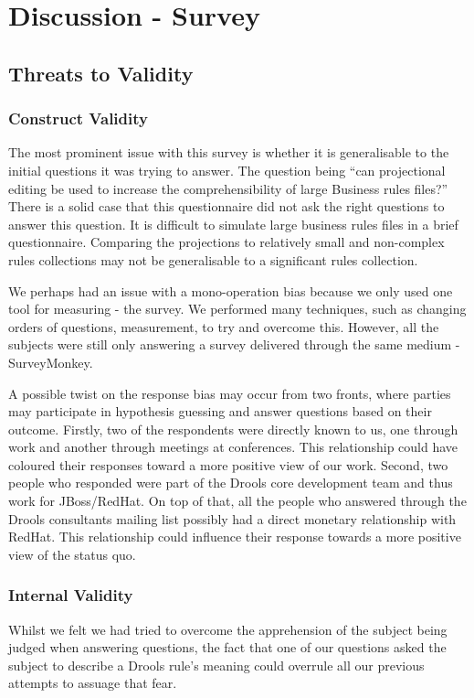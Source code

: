 \section{Discussion - Survey}
\label{section:survey_discussion}

\subsection{Threats to Validity}  

\subsubsection{Construct Validity}
The most prominent issue with this survey is whether it is generalisable to the initial questions it was trying to answer.
The question being ``can projectional editing be used to increase the comprehensibility of large Business rules files?''
There is a solid case that this questionnaire did not ask the right questions to answer this question.
It is difficult to simulate large business rules files in a brief questionnaire.
Comparing the projections to relatively small and non-complex rules collections may not be generalisable to a significant rules collection.

We perhaps had an issue with a mono-operation bias because we only used one tool for measuring - the survey.
We performed many techniques, such as changing orders of questions, measurement, to try and overcome this.
However, all the subjects were still only answering a survey delivered through the same medium - SurveyMonkey.

A possible twist on the response bias may occur from two fronts, where parties may participate in hypothesis guessing and answer questions based on their outcome.
Firstly, two of the respondents were directly known to us, one through work and another through meetings at conferences.
This relationship could have coloured their responses toward a more positive view of our work.
Second, two people who responded were part of the Drools core development team and thus work for JBoss/RedHat.
On top of that, all the people who answered through the Drools consultants mailing list possibly had a direct monetary relationship with RedHat.
This relationship could influence their response towards a more positive view of the status quo.  

\subsubsection{Internal Validity}
Whilst we felt we had tried to overcome the apprehension of the subject being judged when answering questions, the fact that one of our questions asked the subject to describe a Drools rule's meaning could overrule all our previous attempts to assuage that fear.

